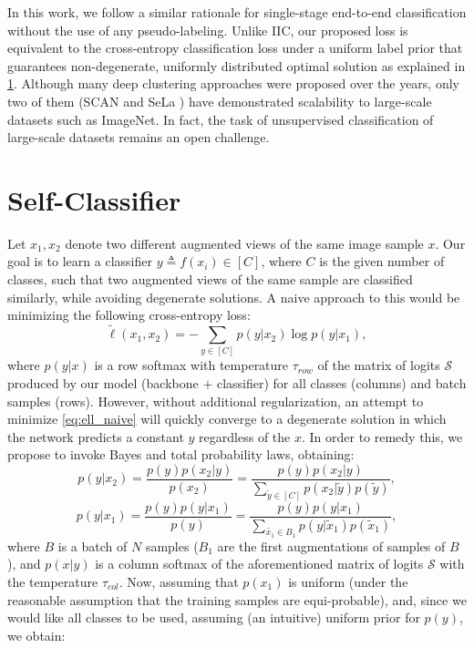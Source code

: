 \documentclass[runningheads]{llncs}
\begin{document}
In this work, we follow a similar rationale for single-stage end-to-end classification without the use of any pseudo-labeling. Unlike IIC, our proposed loss is equivalent to the cross-entropy classification loss under a uniform label prior that guarantees non-degenerate, uniformly distributed optimal solution as explained in \cref{section:self-classifier}. Although many deep clustering approaches were proposed over the years, only two of them (SCAN \cite{van2020scan} and SeLa \cite{YM.2020Self-labelling}) have demonstrated scalability to large-scale datasets such as ImageNet. In fact, the task of unsupervised classification of large-scale datasets remains an open challenge.


\section{Self-Classifier}
\label{section:self-classifier}
Let $x_1, x_2$ denote two different augmented views of the same image sample $x$. Our goal is to learn a classifier $y \triangleq f(x_i) \in [C]$, where $C$ is the given number of classes,
such that two augmented views of the same sample are classified similarly, while avoiding degenerate solutions. 
A naive approach to this would be minimizing the following cross-entropy loss:
\begin{equation}
    \tilde{\ell}(x_1, x_2) = -\sum_{y \in [C]}{p(y|x_2)\log p(y|x_1)},
    \label{eq:ell_naive}
\end{equation}
where $p(y|x)$ is a row softmax with temperature $\tau_{row}$ \cite{wu2018unsupervised} of the matrix of logits $\mathcal{S}$ produced by our model (backbone $+$ classifier) for all classes (columns) and batch samples (rows). However, without additional regularization, an attempt to minimize \cref{eq:ell_naive} will quickly converge to a degenerate solution in which the network predicts a constant $y$ regardless of the $x$. In order to remedy this, we propose to invoke Bayes and total probability laws, obtaining:
\begin{equation}
    p(y|x_2) = \frac{p(y)p(x_2|y)}{p(x_2)} = \frac{p(y)p(x_2|y)}{\sum_{\tilde{y} \in [C]}{p(x_2|\tilde{y}) p(\tilde{y})}},
    \label{eq:full_bayes}
\end{equation}
\begin{equation}
    p(y|x_1) = \frac{p(y)p(y|x_1)}{p(y)} = \frac{p(y)p(y|x_1)}{\sum_{\tilde{x_1} \in B_1}{p(y|\tilde{x}_1) p(\tilde{x}_1)}},
    \label{eq:total_probability}
\end{equation}
where $B$ is a batch of $N$ samples ($B_1$ are the first augmentations of samples of $B$), and $p(x|y)$ is a column softmax of the aforementioned matrix of logits $\mathcal{S}$ with the temperature $\tau_{col}$. Now, assuming that $p(x_1)$ is uniform (under the reasonable assumption that the training samples are equi-probable), and, since we would like all classes to be used, assuming (an intuitive) uniform prior for $p(y)$, we obtain:
\end{document}
